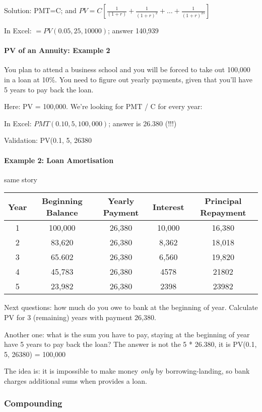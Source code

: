 \documentclass{scrartcl}
\begin{document}
Solution: PMT=C; and $PV = C [ \frac{1}{(1+r)} + \frac{1}{(1+r)^2} + \dots +
\frac{1}{(1+r)^{25}} ]$

In Excel: $=PV(0.05, 25, 10000)$; answer 140,939

\paragraph{PV of an Annuity: Example 2}
\label{sec:3-6-1}

You plan to attend a business school and you will be forced to take out 100,000
in a loan at 10\%. You need to figure out yearly payments, given that you'll
have 5 years to pay back the loan.

Here: PV = 100,000. We're looking for PMT / C for every year:

In Excel: $PMT(0.10, 5, 100,000)$; answer is 26.380 (!!!)

Validation: PV(0.1, 5, 26380

\paragraph{Example 2: Loan Amortisation} same story

\begin{tabular}{c|c|c|c|c}
  Year & Beginning Balance & Yearly Payment & Interest & Principal Repayment \\
  \hline
  1 & 100,000 & 26,380 & 10,000  & 16,380 \\
  2 & 83,620 & 26,380 & 8,362 & 18,018 \\
  3 & 65.602 & 26,380 & 6,560 & 19,820 \\
  4 & 45,783 & 26,380 & 4578 & 21802 \\
  5 & 23,982 & 26,380 & 2398 & 23982 
\end{tabular}

Next questions: how much do you owe to bank at the beginning of year. Calculate
PV for 3 (remaining) years with payment 26,380.

Another one: what is the sum you have to pay, staying at the beginning of year
have 5 years to pay back the loan? The answer is not the 5 * 26.380, it is
PV(0.1, 5, 26380) = 100,000

The idea is: it is impossible to make money {\it only} by borrowing-landing, so
bank charges additional sums when provides a loan.

\subsubsection{Compounding}
\label{sec:3-8}
\end{document}
